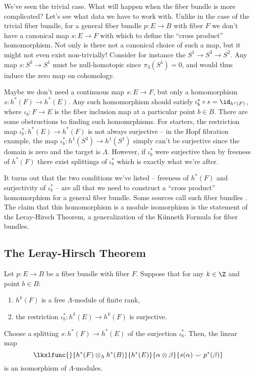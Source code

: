 We've seen the trivial case. What will happen when the fiber bundle is more complicated? Let's see what data we have to work with. Unlike in the case of the trivial fiber bundle, for a general fiber bundle $p : E \to B$ with fiber $F$ we don't have a canonical map $s : E\to F$ with which to define the ``cross product'' homomorphism.
Not only is there not a canonical choice of such a map, but it might not even exist non-trivially! Consider for instance the  $S^1\to S^3 \to S^2$. Any map $s : S^3\to S^1$ must be null-homotopic since $\pi_3(S^1)=0$, and would thus induce the zero map on cohomology.

Maybe we don't need a continuous map $s : E \to F$, but only a homomorphism $s : h^*(F) \to h^*(E)$.
Any such homomorphism should satisfy $\iota_b^*\circ s = \id_{h^*(F)}$, where $\iota_b : F \to E$ is the fiber inclusion map at a particular point $b\in B$. There are some obstructions to finding such homomrphisms. For starters, the restriction map $\iota_b^* : h^*(E) \to h^*(F)$ is not always surjective -- in the Hopf fibration example, the map $\iota_b^* : h^1(S^3) \to h^1(S^1)$ simply can't be surjective since the domain is zero and the target is $\Lambda$. However, if $\iota_b^*$ were surjective then by freeness of $h^*(F)$ there exist splittings of $\iota_b^*$ which is exactly what we're after.

It turns out that the two conditions we've listed -- freeness of $h^*(F)$ and surjectivity of $\iota_b^*$ -- are all that we need to construct a ``cross product'' homomorphism for a general fiber bundle. Some sources call such fiber bundles . The claim that this homomorphism is a module isomorphism is the statement of the Leray-Hirsch Theorem, a generalization of the K\"unneth Formula for fiber bundles.

\subsection{The Leray-Hirsch Theorem}

\begin{theorem}\label{thm:leray-hirsch} Let $p : E \to B$ be a fiber bundle with fiber $F$. Suppose that for any $k\in \Z$ and point $b\in B$:
	\begin{enumerate}
		\item $h^k(F)$ is a free $\Lambda$-module of finite rank,
		\item the restriction $\iota_b^* : h^k(E) \to h^k(F)$ is surjective.
	\end{enumerate}
	Choose a splitting $s : h^*(F) \to h^*(E)$ of the surjection $\iota_b^*$. Then, the linear map
	\[
		\lkxlfunc{}{h^*(F)\otimes_\Lambda h^*(B)}{h^*(E)}{\alpha\otimes \beta}{s(\alpha)\smile p^*(\beta)}
	\]
	is an isomorphism of $\Lambda$-modules.
\end{theorem}

